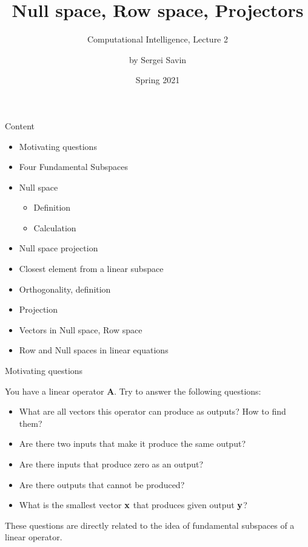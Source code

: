 \documentclass{beamer}
\title{Null space, Row space, Projectors}
\subtitle{Computational Intelligence, Lecture 2}
\author{by Sergei Savin}
\date{Spring 2021}
\begin{document}
\maketitle


\begin{frame}{Content}

\begin{itemize}
\item Motivating questions
\item Four Fundamental Subspaces
\item Null space
\begin{itemize}
    \item Definition
    \item Calculation
\end{itemize}
\item Null space projection
\item Closest element from a linear subspace
\item Orthogonality, definition
\item Projection
\item Vectors in Null space, Row space
\item Row and Null spaces in linear equations
\end{itemize}

\end{frame}




\begin{frame}{Motivating questions}
\begin{flushleft}

You have a linear operator $\mathbf A$. Try to answer the following questions:

\begin{itemize}
    \item What are all vectors this operator can produce as outputs? How to find them?
    \item Are there two inputs that make it produce the same output?
    \item Are there inputs that produce zero as an output?
    \item Are there outputs that cannot be produced? 
    \item What is the smallest vector $\mathbf{x}$ that produces given output $\mathbf{y}$? 
\end{itemize}

These questions are directly related to the idea of fundamental subspaces of a linear operator.

\end{flushleft}
\end{frame}
\end{document}
